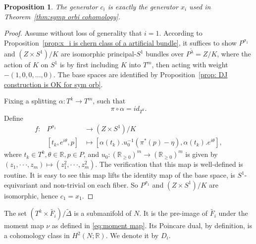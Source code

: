 \documentclass[12pt]{amsart}
\newtheorem{proposition}[theorem]{Proposition}
\theoremstyle{definition}
\numberwithin{equation}{section}
\begin{document}
\begin{proposition}\label{prop:chern class of torus bundle}
The generator $c_{i}$ is exactly the generator $x_{i}$ used in
Theorem~\ref{thm:symp orbi cohomology}.
\end{proposition}
\begin{proof}
Assume without loss of generality that $i=1$. According to
Proposition~\ref{prop:x_i is chern class of a artificial bundle}, it
suffices to show $P^{\sigma_{1}}$ and $(Z\times S^1)/K$ are
isomorphic principal-$S^1$ bundles over $P^{\tilde{\lambda}}=Z/K$,
where the action of $K$ on $S^1$ is by first including $K$ into
$T^m$, then acting with weight $-(1,0,0,...,0)$. The base spaces are
identified by Proposition~\ref{prop: DJ construction is OK for sym
orb}.

Fixing a splitting $\alpha : T^k\rightarrow T^m$, such that
\begin{equation}
\pi\circ\alpha=id_{T^k}.
\end{equation}
Define
\begin{eqnarray*}
f: & P^{\sigma_{1}} & \rightarrow (Z\times S^1)/K \\
   & [t_{k},e^{i\theta},p] & \mapsto [\alpha(t_{k}).u_{0}^{-1}(\pi^{*}(p)-\eta),
   \alpha(t_{k}).e^{i\theta}],
\end{eqnarray*}
where $t_{k}\in T^k, \theta\in {{\mathbb{R}}}, p\in P$, and $u_{0}: ({{\mathbb{R}}}_{\geq
0})^{m}\rightarrow ({{\mathbb{R}}}_{\geq 0})^{m}$ is given by
$(z_1,{{\cdot\cdot\cdot}},z_m)\mapsto (z_1^2,{{\cdot\cdot\cdot}}, z_m^2)$.  The verification
that this map is well-defined is routine. It is easy to see this map
lifts the identity map of the base space, is $S^1$-equivariant and
non-trivial on each fiber. So $P^{\sigma_{1}}$ and $(Z\times S^1)/K$
are isomorphic, hence $c_{1}=x_{1}$.
\end{proof}

The set $(T^k\times\tilde{F_{i}})/\tilde{\Delta}$ is a submanifold
of $N$. It is the pre-image of $\tilde{F_{i}}$ under the moment map
$\nu$ as defined in \eqref{eq:moment map}. Its Poincare dual, by
definition, is a cohomology class in $H^{2}(N;{{\mathbb{R}}})$. We denote it by
$D_{i}$.
\end{document}
